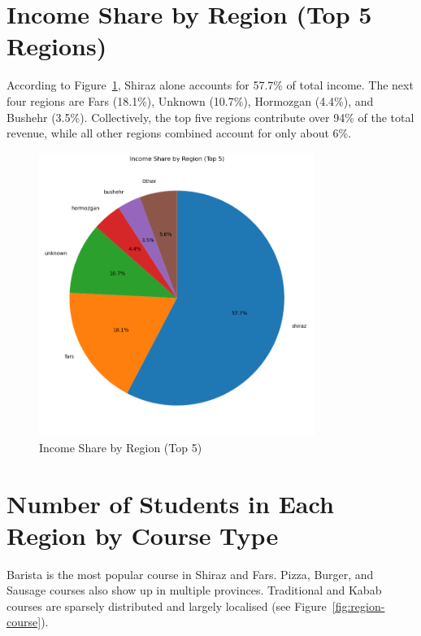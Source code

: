 \documentclass[12pt,a4paper]{article}
\begin{document}
\section{Income Share by Region (Top 5 Regions)}
According to Figure~\ref{fig:income-share}, Shiraz alone accounts for 57.7\% of total income. The next four regions are Fars (18.1\%), Unknown (10.7\%), Hormozgan (4.4\%), and Bushehr (3.5\%). Collectively, the top five regions contribute over 94\% of the total revenue, while all other regions combined account for only about 6\%.

\begin{figure}[h!]
    \centering
    \includegraphics[width=0.8\textwidth]{Income Share by Region (Top 5) Pie Chart.png}
    \caption{Income Share by Region (Top 5)}
    \label{fig:income-share}
\end{figure}

\section{Number of Students in Each Region by Course Type}
Barista is the most popular course in Shiraz and Fars. Pizza, Burger, and Sausage courses also show up in multiple provinces. Traditional and Kabab courses are sparsely distributed and largely localised (see Figure~\ref{fig:region-course}).
\end{document}
